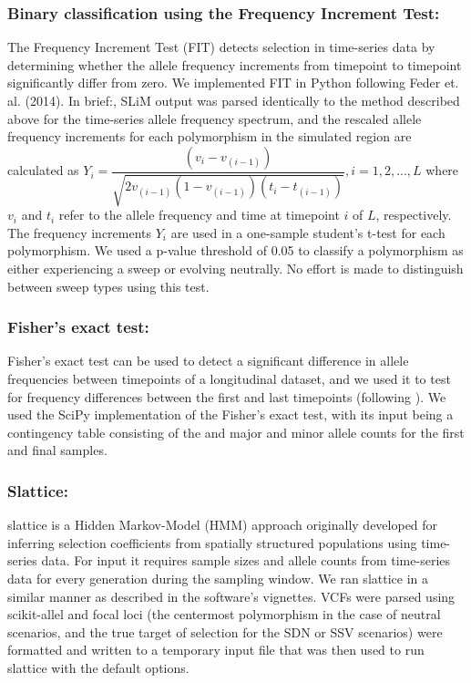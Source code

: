 \subsubsection{Binary classification using the Frequency Increment Test: } The Frequency Increment Test (FIT) detects selection in time-series data by determining whether the allele frequency increments from timepoint to timepoint significantly differ from zero. We implemented FIT in Python following Feder et. al. (2014). In brief:, SLiM output was parsed identically to the method described above for the time-series allele frequency spectrum, and the rescaled allele frequency increments for each polymorphism in the simulated region are calculated as $Y_i=\dfrac{(v_i-v_{(i-1)})}{\sqrt{2v_{(i-1)} (1-v_{(i-1)})(t_i-t_{(i-1)})}}, i=1,2,$...$,L$
 where $v_i$ and $t_i$ refer to the allele frequency and time at timepoint $i$ of $L$, respectively. The frequency increments $Y_i$ are used in a one-sample student’s t-test for each polymorphism. We used a p-value threshold of 0.05 to classify a polymorphism as either experiencing a sweep or evolving neutrally. No effort is made to distinguish between sweep types using this test. 

\subsubsection{Fisher’s exact test: } Fisher’s exact test can be used to detect a significant difference in allele frequencies between timepoints of a longitudinal dataset, and we used it to test for frequency differences between the first and last timepoints (following \cite{barghiGeneticRedundancyFuels2019}). We used the SciPy \cite{virtanenSciPyFundamentalAlgorithms2020} implementation of the Fisher’s exact test, with its input being a contingency table consisting of the and major and minor allele counts for the first and final samples.

\subsubsection{Slattice: } slattice \cite{mathiesonEstimatingSelectionCoefficients2013} is a Hidden Markov-Model (HMM) approach originally developed for inferring selection coefficients from spatially structured populations using time-series data. For input it requires sample sizes and allele counts from time-series data for every generation during the sampling window. We ran slattice in a similar manner as described in the software’s vignettes. VCFs were parsed using scikit-allel and focal loci (the centermost polymorphism in the case of neutral scenarios, and the true target of selection for the SDN or SSV scenarios) were formatted and written to a temporary input file that was then used to run slattice with the default options.

